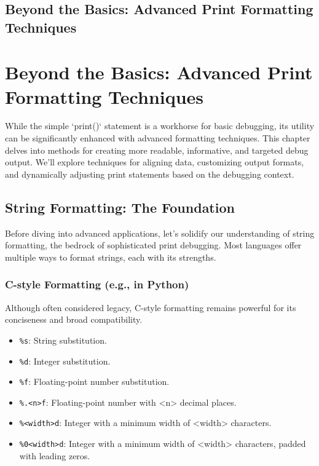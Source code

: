 \documentclass{article}
\begin{document}
\newpage

\section*{Beyond the Basics: Advanced Print Formatting Techniques} %
\label{chapter-1-10-Beyond_the_Basics__Advanced_Print_Format}

\chapter{Beyond the Basics: Advanced Print Formatting Techniques}

While the simple `print()` statement is a workhorse for basic debugging, its utility can be significantly enhanced with advanced formatting techniques. This chapter delves into methods for creating more readable, informative, and targeted debug output. We'll explore techniques for aligning data, customizing output formats, and dynamically adjusting print statements based on the debugging context.

\section*{String Formatting: The Foundation}

Before diving into advanced applications, let's solidify our understanding of string formatting, the bedrock of sophisticated print debugging. Most languages offer multiple ways to format strings, each with its strengths.

\subsection*{C-style Formatting (e.g., in Python)}

Although often considered legacy, C-style formatting remains powerful for its conciseness and broad compatibility.

\begin{itemize}
    \item{\texttt{\%s}: String substitution.}
    \item{\texttt{\%d}: Integer substitution.}
    \item{\texttt{\%f}: Floating-point number substitution.}
    \item{\texttt{\%.<n>f}: Floating-point number with <n> decimal places.}
    \item{\texttt{\%<width>d}: Integer with a minimum width of <width> characters.}
    \item{\texttt{\%0<width>d}: Integer with a minimum width of <width> characters, padded with leading zeros.}
\end{itemize}
\end{document}
